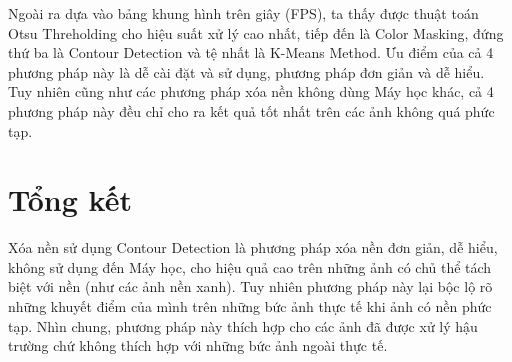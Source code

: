 \documentclass[conference]{IEEEtran}
\begin{document}
Ngoài ra dựa vào bảng khung hình trên giây (FPS), ta thấy được thuật toán Otsu Threholding cho hiệu suất xử lý cao nhất, tiếp đến là Color Masking, đứng thứ ba là Contour Detection và tệ nhất là K-Means Method.
Ưu điểm của cả 4 phương pháp này là dễ cài đặt và sử dụng, phương pháp đơn giản và dễ hiểu. Tuy nhiên cũng như các phương pháp xóa nền không dùng Máy học khác, cả 4 phương pháp này đều chỉ cho ra kết quả tốt nhất trên các ảnh không quá phức tạp.
\section{Tổng kết}
 Xóa nền sử dụng Contour Detection là phương pháp xóa nền đơn giản, dễ hiểu, không sử dụng đến Máy học, cho hiệu quả cao trên những ảnh có chủ thể tách biệt với nền (như các ảnh nền xanh). Tuy nhiên phương pháp này lại bộc lộ rõ những khuyết điểm của mình trên những bức ảnh thực tế khi ảnh có nền phức tạp. Nhìn chung, phương pháp này thích hợp cho các ảnh đã được xử lý hậu trường chứ không thích hợp với những bức ảnh ngoài thực tế. 
\begin{thebibliography}{00}
 \url{https://en.wikipedia.org/wiki/Foreground_detection}}
\bibitem{b2} \url{https://machinelearningknowledge.ai/image-segmentation-in-python-opencv/#ii_Contour_Detection}
\bibitem{b3} \url{https://bleedai.com/contour-detection-101-the-basics-pt1/}
\bibitem{b4} \url{https://learnopencv.com/contour-detection-using-opencv-python-c/}
\bibitem{b5} \url{https://docs.opencv.org/4.x/d3/db4/tutorial_py_watershed.html}
\bibitem{b6} \url{https://docs.opencv.org/3.4/d4/d73/tutorial_py_contours_begin.html}
\bibitem{b7} \url{https://www.banuba.com/blog/background-subtraction-guide}
\end{thebibliography}
\end{document}
